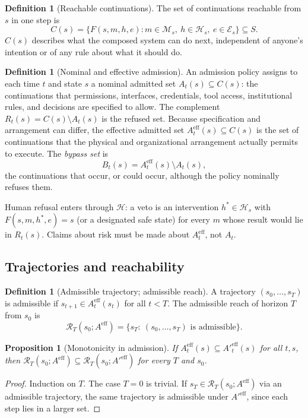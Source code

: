 \documentclass[11pt]{article}
\newtheorem{proposition}[theorem]{Proposition}
\theoremstyle{definition}
\newtheorem{definition}[theorem]{Definition}
\begin{document}
\begin{definition}[Reachable continuations]
The set of continuations reachable from $s$ in one step is
\[
C(s)=\{F(s,m,h,e): m\in\mathcal{M}_s,\ h\in\mathcal{H}_s,\ e\in\mathcal{E}_s\}\subseteq S .
\]
$C(s)$ describes what the composed system can do next, independent of anyone's intention or of any rule about what it should do.
\end{definition}

\begin{definition}[Nominal and effective admission]
An admission policy assigns to each time $t$ and state $s$ a nominal admitted set $A_t(s)\subseteq C(s)$: the continuations that permissions, interfaces, credentials, tool access, institutional rules, and decisions are specified to allow. The complement $R_t(s)=C(s)\setminus A_t(s)$ is the refused set. Because specification and arrangement can differ, the effective admitted set $A_t^{\mathrm{eff}}(s)\subseteq C(s)$ is the set of continuations that the physical and organizational arrangement actually permits to execute. The \emph{bypass set} is
\[
B_t(s)=A_t^{\mathrm{eff}}(s)\setminus A_t(s),
\]
the continuations that occur, or could occur, although the policy nominally refuses them.
\end{definition}

Human refusal enters through $\mathcal{H}$: a veto is an intervention $h^\ast\in\mathcal{H}_s$ with $F(s,m,h^\ast,e)=s$ (or a designated safe state) for every $m$ whose result would lie in $R_t(s)$. Claims about risk must be made about $A_t^{\mathrm{eff}}$, not $A_t$.

\subsection{Trajectories and reachability}

\begin{definition}[Admissible trajectory; admissible reach]
A trajectory $(s_0,\dots,s_T)$ is admissible if $s_{t+1}\in A_t^{\mathrm{eff}}(s_t)$ for all $t<T$. The admissible reach of horizon $T$ from $s_0$ is
\[
\mathcal{R}_T(s_0;A^{\mathrm{eff}})=\{s_T:\ (s_0,\dots,s_T)\text{ is admissible}\}.
\]
\end{definition}

\begin{proposition}[Monotonicity in admission]\label{prop:A1}
If $A^{\mathrm{eff}}_t(s)\subseteq A'^{\mathrm{eff}}_t(s)$ for all $t,s$, then $\mathcal{R}_T(s_0;A^{\mathrm{eff}})\subseteq\mathcal{R}_T(s_0;A'^{\mathrm{eff}})$ for every $T$ and $s_0$.
\end{proposition}
\begin{proof}
Induction on $T$. The case $T=0$ is trivial. If $s_T\in\mathcal{R}_T(s_0;A^{\mathrm{eff}})$ via an admissible trajectory, the same trajectory is admissible under $A'^{\mathrm{eff}}$, since each step lies in a larger set.
\end{proof}
\end{document}

